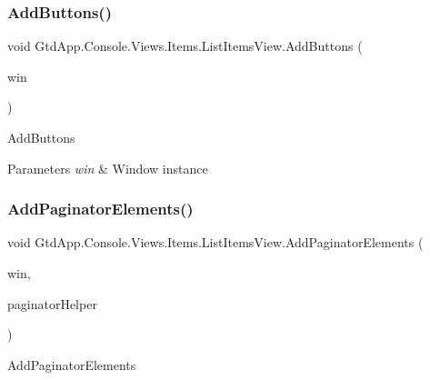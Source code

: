 \subsubsection{\texorpdfstring{Add\+Buttons()}{AddButtons()}}
{\footnotesize\ttfamily void Gtd\+App.\+Console.\+Views.\+Items.\+List\+Items\+View.\+Add\+Buttons (\begin{DoxyParamCaption}\item[{Window}]{win }\end{DoxyParamCaption})\hspace{0.3cm}{\ttfamily [protected]}}



Add\+Buttons 


\begin{DoxyParams}{Parameters}
{\em win} & Window instance\\
\hline
\end{DoxyParams}
\mbox{\label{class_gtd_app_1_1_console_1_1_views_1_1_items_1_1_list_items_view_a0caea127ed8771e3dac2e88a0b3332a0}} 
\subsubsection{\texorpdfstring{Add\+Paginator\+Elements()}{AddPaginatorElements()}}
{\footnotesize\ttfamily void Gtd\+App.\+Console.\+Views.\+Items.\+List\+Items\+View.\+Add\+Paginator\+Elements (\begin{DoxyParamCaption}\item[{Window}]{win,  }\item[{\mbox{\hyperlink{class_gtd_app_1_1_console_core_1_1_views_1_1_helpers_1_1_paginator_helper}{Paginator\+Helper}}}]{paginator\+Helper }\end{DoxyParamCaption})\hspace{0.3cm}{\ttfamily [protected]}}



Add\+Paginator\+Elements 


